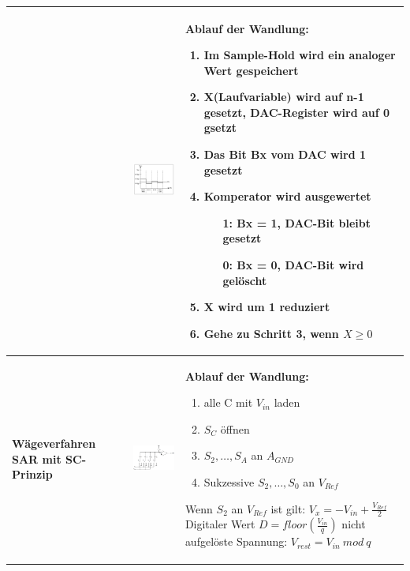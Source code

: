 \begin{longtable}{|>{\bfseries}p{4cm}|p{6cm}|p{8cm}|}
    &
    \includegraphics[width=6cm, valign=t]{images/prinzip_SAR.png} &
    \textbf{Ablauf der Wandlung:}
    \begin{enumerate}
      \item Im Sample-Hold wird ein analoger Wert gespeichert
      \item X(Laufvariable) wird auf n-1 gesetzt, DAC-Register wird auf 0 gsetzt
      \item Das Bit Bx vom DAC wird 1 gesetzt
      \item Komperator wird ausgewertet
            \begin{itemize}
              \item[1:] Bx = 1, DAC-Bit bleibt gesetzt
              \item[0:] Bx = 0, DAC-Bit wird gelöscht
            \end{itemize}
      \item X wird um 1 reduziert
      \item Gehe zu Schritt 3, wenn $X \geq 0$ 
    \end{enumerate} \\
  \hline
    Wägeverfahren SAR mit SC-Prinzip &
    \includegraphics[width=6cm, valign=t]{images/waegeverfahrenSC} &
    \textbf{Ablauf der Wandlung:}
    \begin{enumerate}
      \item alle C mit $V_{in}$ laden
      \item $S_C$ öffnen
      \item $S_2, \ldots, S_A$ an $A_{GND}$
      \item Sukzessive $S_2, \ldots, S_0$ an $V_{Ref}$
    \end{enumerate}
    Wenn $S_2$ an $V_{Ref}$ ist gilt: $V_x = -V_{in}+\frac{V_{Ref}}{2}$ \newline
    Digitaler Wert $D = floor\left( \frac{V_{in}}{q}\right)$ \newline
    nicht aufgelöste Spannung: $V_{rest} = V_{in} \ mod \ q$\\
  \hline
\end{longtable}

